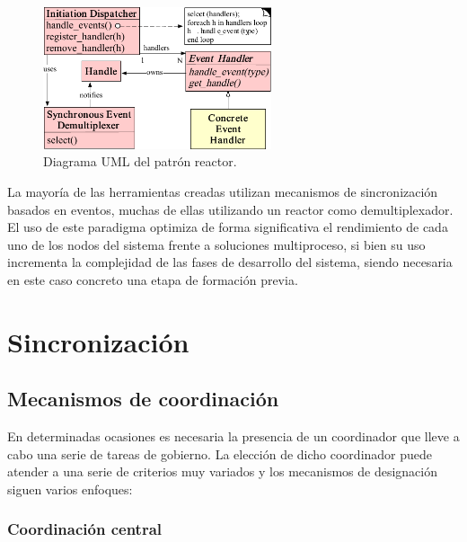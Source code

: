 \begin{figure}[H]
  \centering
  \includegraphics[width=0.6\textwidth]{Chapter2/Figures/reactoruml}
  \caption[Diagrama UML del patrón reactor]{Diagrama UML del patrón reactor\label{Coplien95reactor}.}
  \label{fig:reactoruml}
\end{figure}


La mayoría de las herramientas creadas utilizan mecanismos de sincronización basados en eventos, muchas de ellas utilizando un reactor como demultiplexador. El uso de este paradigma optimiza de forma significativa el rendimiento de cada uno de los nodos del sistema frente a soluciones multiproceso, si bien su uso incrementa la complejidad de las fases de desarrollo del sistema, siendo necesaria en este caso concreto una etapa de formación previa.

\section{Sincronización}

\subsection{Mecanismos de coordinación}

En determinadas ocasiones es necesaria la presencia de un coordinador que lleve a cabo una serie de tareas de gobierno. La elección de dicho coordinador puede atender a una serie de criterios muy variados y los mecanismos de designación siguen varios enfoques:

\subsubsection{Coordinación central}

